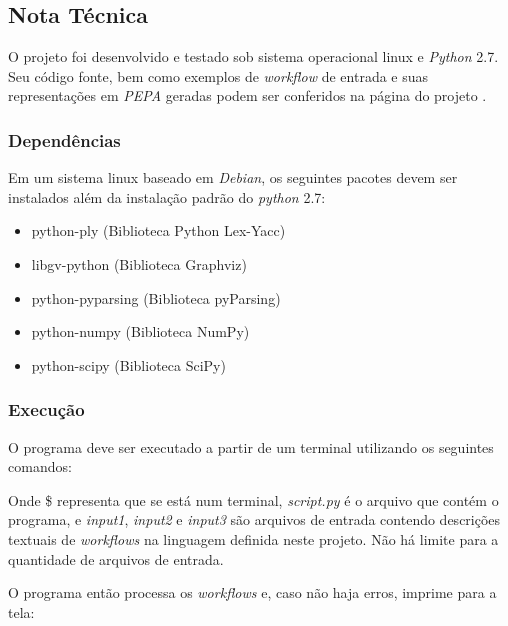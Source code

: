 \documentclass[a4paper,11pt]{article}
\begin{document}
    \newpage
	\subsection{Nota Técnica}

		O projeto foi desenvolvido e testado sob sistema operacional linux e \emph{Python} 2.7.
        Seu c\'odigo fonte, bem como exemplos de \emph{workflow} de entrada e suas representaç\~oes em \emph{PEPA} geradas podem ser conferidos na p\'agina do projeto \cite{web:script}.

        \subsubsection{Depend\^encias}
            Em um sistema linux baseado em \emph{Debian}, os seguintes pacotes devem ser instalados al\'em da instalaç\~ao padrão do \emph{python} 2.7:

            \begin{itemize}
                \item python-ply (Biblioteca Python Lex-Yacc)
                \item libgv-python (Biblioteca Graphviz)
                \item python-pyparsing (Biblioteca pyParsing)
                \item python-numpy (Biblioteca NumPy)
                \item python-scipy (Biblioteca SciPy)

            \end{itemize}

        \subsubsection{Execução}
            O programa deve ser executado a partir de um terminal utilizando os seguintes comandos:

            

            Onde \$ representa que se est\'a num terminal, \emph{script.py} \'e o arquivo que cont\'em o programa, e \emph{input1}, \emph{input2} e \emph{input3} s\~ao arquivos de entrada contendo descriç\~oes textuais de \emph{workflows} na linguagem definida neste projeto. Não h\'a limite para a quantidade de arquivos de entrada.

            O programa então processa os \emph{workflows} e, caso não haja erros, imprime para a tela:
            
\end{document}
